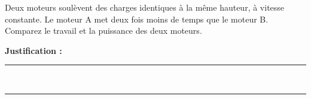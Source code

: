 Deux moteurs soulèvent des charges identiques à la même hauteur, à vitesse constante. Le moteur A met deux fois moins de temps que le moteur B. Comparez le travail et la puissance des deux moteurs.

\choices

\noindent\textbf{Justification :} \hrulefill \\[2.5ex]
\rule{\linewidth}{0.4pt} \\[2.5ex]
\rule{\linewidth}{0.4pt}
\vfill
